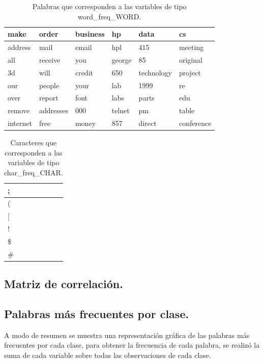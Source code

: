 \documentclass[12pt, letterpaper]{article}
\begin{document}
\begin{table}[ht]
\centering
\begin{tabular}{|l|l|l|l|l|l|}
\hline
make     & order     & business & hp     & data       & cs         \\ \hline
address  & mail      & email    & hpl    & 415        & meeting    \\ \hline
all      & receive   & you      & george & 85         & original   \\ \hline
3d       & will      & credit   & 650    & technology & project    \\ \hline
our      & people    & your     & lab    & 1999       & re         \\ \hline
over     & report    & font     & labs   & parts      & edu        \\ \hline
remove   & addresses & 000      & telnet & pm         & table      \\ \hline
internet & free      & money    & 857    & direct     & conference \\ \hline
\end{tabular}
\caption{Palabras que corresponden a las variables de tipo word\_freq\_WORD.}
\label{t_words}
\end{table}

\begin{table}[ht]
\centering
\begin{tabular}{|l|}
\hline
;   \\ \hline
(   \\ \hline
{[} \\ \hline
!   \\ \hline
\$  \\ \hline
\#  \\ \hline
\end{tabular}
\caption{Caracteres que corresponden a las variables de tipo char\_freq\_CHAR.}
\label{t_chars}
\end{table}

\subsection{Matriz de correlación.}

\subsection{Palabras más frecuentes por clase.}

A modo de resumen se muestra una representación gráfica de las palabras más frecuentes por cada clase, para obtener la frecuencia de cada palabra, se realizó la suma de cada variable sobre todas las observaciones de cada clase.
\end{document}
